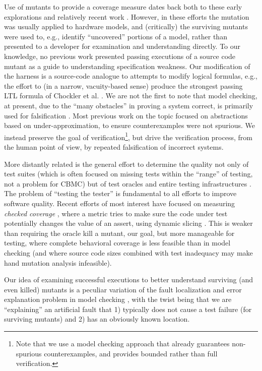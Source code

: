 \documentclass{svjour3}
\begin{document}
Use of mutants \cite{MutSpec,MutCov} to provide a coverage measure dates back both to
these early explorations and relatively recent work \cite{MutTheory,Arbiters,MutInterp}.
However, in these efforts the mutation was usually applied to hardware
models, and (critically) the surviving mutants were used to, e.g., identify
``uncovered'' portions of a model, rather than presented to a
developer for examination and understanding directly.  To our
knowledge, no previous work presented passing executions of a source
code mutant as a guide to understanding specification weakness.  Our
modification of the harness is a source-code analogue to attempts to
modify logical formulas, e.g., the effort to (in a narrow,
vacuity-based sense) produce the strongest passing LTL formula
of Chockler et al. \cite{BeyondVac}.  We are not the first to note
that model checking, at present, due to the ``many obstacles'' in
proving a system correct, is primarily used for falsification
\cite{AbsFals}.  Most previous work on the topic \cite{AbsFals} focused on
abstractions based on under-approximation, to ensure counterexamples
were not spurious. We instead preserve the goal of
verification\footnote{Note that we use a model checking approach that
  already guarantees non-spurious counterexamples, and provides
  bounded rather than full verification.}, but drive the verification
process, from the human point of view, by repeated falsification of
incorrect systems.

More distantly related is the general effort to determine the quality
not only of test suites (which is often focused on missing tests
within the ``range'' of testing, not a problem for CBMC) but of test
oracles and entire testing infrastructures \cite{oracleMcMinn}.  The problem of ``testing
the tester'' \cite{WODA09} is fundamental to all efforts
to improve software quality.  Recent efforts of most interest have
focused on measuring \emph{checked coverage} \cite{CheckedCov,CheckedJournal,ThereYet}, where
a metric tries to make sure the code under test potentially changes
the value of an assert, using dynamic slicing \cite{DynSlice,Tip}.  This is weaker than requiring the oracle kill
a mutant, our goal, but more manageable for testing, where complete
behavioral coverage is less feasible than in model checking (and where
source code sizes combined with test inadequacy may make hand mutation analysis infeasible).

Our idea of examining successful executions to better understand
surviving (and even killed) mutants is a peculiar variation of the
fault localization and error explanation problem in model checking
\cite{GroceDist}, with the twist being that we are ``explaining'' an
artificial fault that 1) typically does not cause a test failure (for
surviving mutants) and 2) has an obviously known location.
\end{document}
